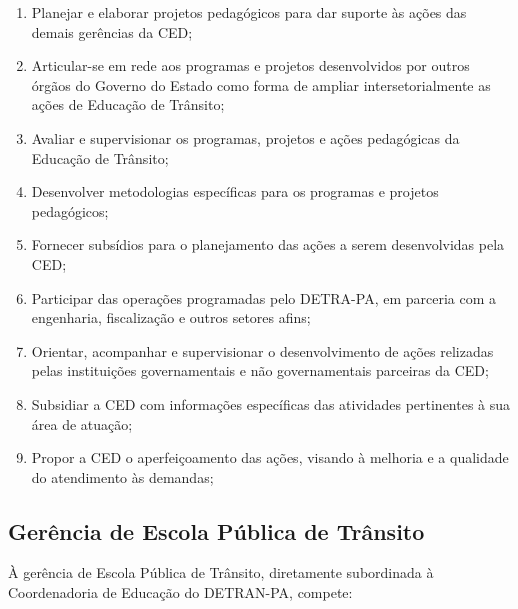 \documentclass[a4paper]{article}
\begin{document}
\begin{enumerate}
\item Planejar e elaborar projetos pedagógicos para dar suporte às ações das demais gerências da CED;
\item Articular-se em rede aos programas e projetos desenvolvidos por outros órgãos do Governo do Estado como forma de ampliar intersetorialmente as ações de Educação de Trânsito;
\item Avaliar e supervisionar os programas, projetos e ações pedagógicas da Educação de Trânsito;
\item Desenvolver metodologias específicas para os programas  e projetos pedagógicos;
\item Fornecer subsídios para o planejamento das ações a serem desenvolvidas pela CED;
\item Participar das operações programadas pelo DETRA-PA, em parceria com a engenharia, fiscalização e outros setores afins;
\item Orientar, acompanhar e supervisionar o desenvolvimento de ações relizadas pelas instituições governamentais e não governamentais parceiras da CED;
\item Subsidiar a CED com informações específicas das atividades pertinentes à sua área de atuação;
\item Propor a CED o aperfeiçoamento das ações, visando à melhoria e a qualidade do atendimento às demandas;
\end{enumerate}



\subsection{Gerência de Escola Pública de Trânsito}

À gerência de Escola Pública de Trânsito, diretamente subordinada à Coordenadoria de Educação do DETRAN-PA, compete:
\end{document}
